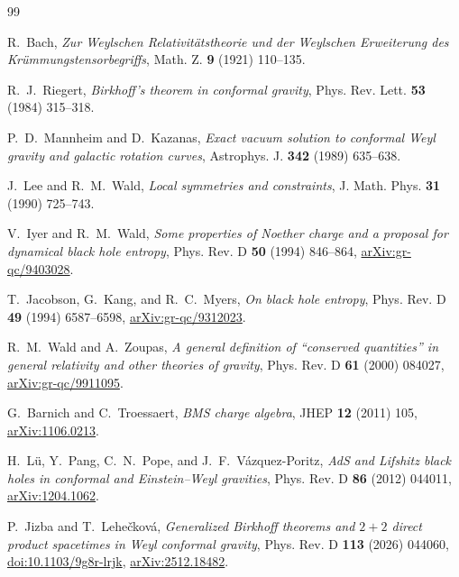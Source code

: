 \documentclass[11pt]{article}
\theoremstyle{definition}
\theoremstyle{remark}
\begin{document}
\begingroup
\raggedright
\begin{thebibliography}{99}

R.~Bach,
\emph{Zur Weylschen Relativit\"atstheorie und der Weylschen Erweiterung des
Kr\"ummungstensorbegriffs},
Math. Z. \textbf{9} (1921) 110--135.

R.~J.~Riegert,
\emph{Birkhoff's theorem in conformal gravity},
Phys. Rev. Lett. \textbf{53} (1984) 315--318.

P.~D.~Mannheim and D.~Kazanas,
\emph{Exact vacuum solution to conformal Weyl gravity and galactic rotation
curves},
Astrophys. J. \textbf{342} (1989) 635--638.

J.~Lee and R.~M.~Wald,
\emph{Local symmetries and constraints},
J. Math. Phys. \textbf{31} (1990) 725--743.

V.~Iyer and R.~M.~Wald,
\emph{Some properties of Noether charge and a proposal for dynamical black
hole entropy},
Phys. Rev. D \textbf{50} (1994) 846--864,
\href{https://arxiv.org/abs/gr-qc/9403028}{arXiv:gr-qc/9403028}.

T.~Jacobson, G.~Kang, and R.~C.~Myers,
\emph{On black hole entropy},
Phys. Rev. D \textbf{49} (1994) 6587--6598,
\href{https://arxiv.org/abs/gr-qc/9312023}{arXiv:gr-qc/9312023}.

R.~M.~Wald and A.~Zoupas,
\emph{A general definition of ``conserved quantities'' in general
relativity and other theories of gravity},
Phys. Rev. D \textbf{61} (2000) 084027,
\href{https://arxiv.org/abs/gr-qc/9911095}{arXiv:gr-qc/9911095}.

G.~Barnich and C.~Troessaert,
\emph{BMS charge algebra},
JHEP \textbf{12} (2011) 105,
\href{https://arxiv.org/abs/1106.0213}{arXiv:1106.0213}.

H.~L\"u, Y.~Pang, C.~N.~Pope, and J.~F.~V\'azquez-Poritz,
\emph{AdS and Lifshitz black holes in conformal and Einstein--Weyl
gravities},
Phys. Rev. D \textbf{86} (2012) 044011,
\href{https://arxiv.org/abs/1204.1062}{arXiv:1204.1062}.

P.~Jizba and T.~Lehe\v{c}kov\'a,
\emph{Generalized Birkhoff theorems and \(2+2\) direct product spacetimes in
Weyl conformal gravity},
Phys. Rev. D \textbf{113} (2026) 044060,
\href{https://doi.org/10.1103/9g8r-lrjk}{doi:10.1103/9g8r-lrjk},
\href{https://arxiv.org/abs/2512.18482}{arXiv:2512.18482}.

\end{thebibliography}
\endgroup
\end{document}
